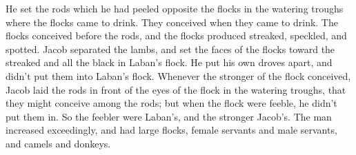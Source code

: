 {He set the rods which he had peeled opposite the flocks in the watering troughs where the flocks came to drink. They conceived when they came to drink.
The flocks conceived before the rods, and the flocks produced streaked, speckled, and spotted.
Jacob separated the lambs, and set the faces of the flocks toward the streaked and all the black in Laban’s flock. He put his own droves apart, and didn’t put them into Laban’s flock.
Whenever the stronger of the flock conceived, Jacob laid the rods in front of the eyes of the flock in the watering troughs, that they might conceive among the rods;
but when the flock were feeble, he didn’t put them in. So the feebler were Laban’s, and the stronger Jacob’s.
The man increased exceedingly, and had large flocks, female servants and male servants, and camels and donkeys.

}
